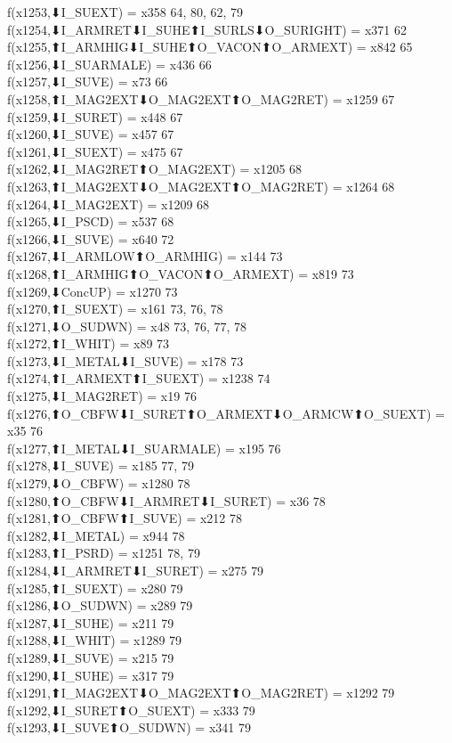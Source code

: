 f(x1253,⬇I_SUEXT) = x358 {64, 80, 62, 79} \\
f(x1254,⬇I_ARMRET⬇I_SUHE⬆I_SURLS⬇O_SURIGHT) = x371 {62} \\
f(x1255,⬆I_ARMHIG⬇I_SUHE⬆O_VACON⬆O_ARMEXT) = x842 {65} \\
f(x1256,⬇I_SUARMALE) = x436 {66} \\
f(x1257,⬇I_SUVE) = x73 {66} \\
f(x1258,⬆I_MAG2EXT⬇O_MAG2EXT⬆O_MAG2RET) = x1259 {67} \\
f(x1259,⬇I_SURET) = x448 {67} \\
f(x1260,⬇I_SUVE) = x457 {67} \\
f(x1261,⬇I_SUEXT) = x475 {67} \\
f(x1262,⬇I_MAG2RET⬆O_MAG2EXT) = x1205 {68} \\
f(x1263,⬆I_MAG2EXT⬇O_MAG2EXT⬆O_MAG2RET) = x1264 {68} \\
f(x1264,⬇I_MAG2EXT) = x1209 {68} \\
f(x1265,⬇I_PSCD) = x537 {68} \\
f(x1266,⬇I_SUVE) = x640 {72} \\
f(x1267,⬇I_ARMLOW⬆O_ARMHIG) = x144 {73} \\
f(x1268,⬆I_ARMHIG⬆O_VACON⬆O_ARMEXT) = x819 {73} \\
f(x1269,⬇ConcUP) = x1270 {73} \\
f(x1270,⬆I_SUEXT) = x161 {73, 76, 78} \\
f(x1271,⬇O_SUDWN) = x48 {73, 76, 77, 78} \\
f(x1272,⬆I_WHIT) = x89 {73} \\
f(x1273,⬇I_METAL⬇I_SUVE) = x178 {73} \\
f(x1274,⬆I_ARMEXT⬆I_SUEXT) = x1238 {74} \\
f(x1275,⬇I_MAG2RET) = x19 {76} \\
f(x1276,⬆O_CBFW⬇I_SURET⬆O_ARMEXT⬇O_ARMCW⬆O_SUEXT) = x35 {76} \\
f(x1277,⬆I_METAL⬇I_SUARMALE) = x195 {76} \\
f(x1278,⬇I_SUVE) = x185 {77, 79} \\
f(x1279,⬇O_CBFW) = x1280 {78} \\
f(x1280,⬆O_CBFW⬇I_ARMRET⬇I_SURET) = x36 {78} \\
f(x1281,⬆O_CBFW⬆I_SUVE) = x212 {78} \\
f(x1282,⬇I_METAL) = x944 {78} \\
f(x1283,⬆I_PSRD) = x1251 {78, 79} \\
f(x1284,⬇I_ARMRET⬇I_SURET) = x275 {79} \\
f(x1285,⬆I_SUEXT) = x280 {79} \\
f(x1286,⬇O_SUDWN) = x289 {79} \\
f(x1287,⬇I_SUHE) = x211 {79} \\
f(x1288,⬇I_WHIT) = x1289 {79} \\
f(x1289,⬇I_SUVE) = x215 {79} \\
f(x1290,⬇I_SUHE) = x317 {79} \\
f(x1291,⬆I_MAG2EXT⬇O_MAG2EXT⬆O_MAG2RET) = x1292 {79} \\
f(x1292,⬇I_SURET⬆O_SUEXT) = x333 {79} \\
f(x1293,⬇I_SUVE⬆O_SUDWN) = x341 {79} \\
